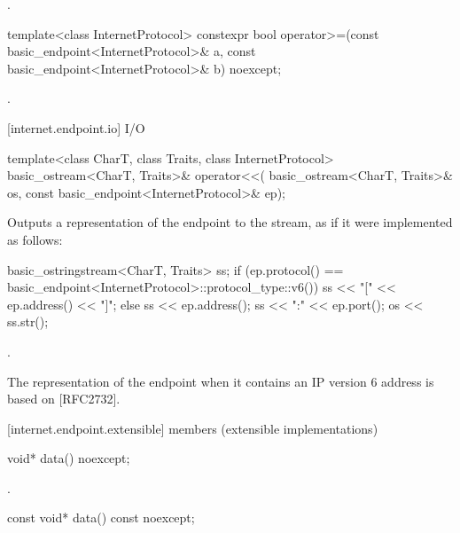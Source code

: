 \begin{itemdescr}
\pnum
\returns {}.
\end{itemdescr}

\begin{itemdecl}
template<class InternetProtocol>
  constexpr bool operator>=(const basic_endpoint<InternetProtocol>& a,
                            const basic_endpoint<InternetProtocol>& b) noexcept;
\end{itemdecl}

\begin{itemdescr}
\pnum
\returns {}.
\end{itemdescr}



[internet.endpoint.io]{ I/O}

\begin{itemdecl}
template<class CharT, class Traits, class InternetProtocol>
  basic_ostream<CharT, Traits>& operator<<(
    basic_ostream<CharT, Traits>& os,
    const basic_endpoint<InternetProtocol>& ep);
\end{itemdecl}

\begin{itemdescr}
\pnum
\effects Outputs a representation of the endpoint to the stream, as if it were implemented as follows: 
\begin{codeblock}
basic_ostringstream<CharT, Traits> ss;
if (ep.protocol() == basic_endpoint<InternetProtocol>::protocol_type::v6())
  ss << "[" << ep.address() << "]";
else
  ss << ep.address();
ss << ":" << ep.port();
os << ss.str();
\end{codeblock}


\pnum
\returns {}.
\end{itemdescr}

\pnum
\enternote The representation of the endpoint when it contains an IP version 6 address is based on [RFC2732]. \exitnote


[internet.endpoint.extensible]{ members (extensible implementations)}

\begin{itemdecl}
void* data() noexcept;
\end{itemdecl}

\begin{itemdescr}
\pnum
\returns {}.
\end{itemdescr}

\begin{itemdecl}
const void* data() const noexcept;
\end{itemdecl}

